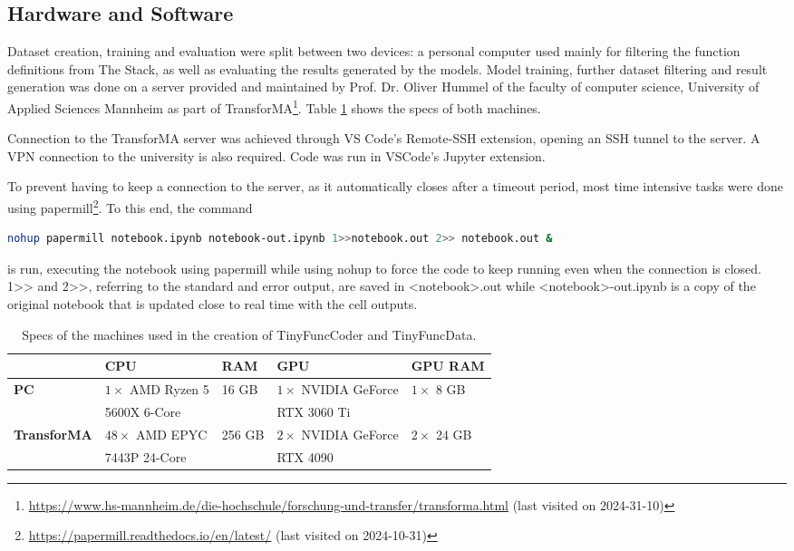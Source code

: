 \subsection{Hardware and Software}
\label{sec:hardware}
Dataset creation, training and evaluation were split between two devices: a personal computer used mainly for filtering the function definitions from The Stack, as well as evaluating the results generated by the models.
Model training, further dataset filtering and result generation was done on a server provided and maintained by Prof. Dr. Oliver Hummel of the faculty of computer science, University of Applied Sciences Mannheim as part of TransforMA\footnote{\url{https://www.hs-mannheim.de/die-hochschule/forschung-und-transfer/transforma.html} (last visited on 2024-31-10)}.
Table \ref{tab:architecture} shows the specs of both machines.

Connection to the TransforMA server was achieved through VS Code's Remote-SSH extension, opening an SSH tunnel to the server.
A VPN connection to the university is also required.
Code was run in VSCode's Jupyter extension.

To prevent having to keep a connection to the server, as it automatically closes after a timeout period, most time intensive tasks were done using papermill\footnote{\url{https://papermill.readthedocs.io/en/latest/} (last visited on 2024-10-31)}.
To this end, the command
\begin{lstlisting}[language=bash]
    nohup papermill notebook.ipynb notebook-out.ipynb 1>>notebook.out 2>> notebook.out &
\end{lstlisting}
is run, executing the notebook using papermill while using nohup to force the code to keep running even when the connection is closed.
1>{}> and 2>{}>, referring to the standard and error output, are saved in <notebook>.out while <notebook>-out.ipynb is a copy of the original notebook that is updated close to real time with the cell outputs.

\begin{table}[!h]
    \centering
    \caption{Specs of the machines used in the creation of TinyFuncCoder and TinyFuncData.}
    \begin{tabular}{l|l|l|l|l}
        \hline
        & \textbf{CPU} & \textbf{RAM} & \textbf{GPU} & \textbf{GPU RAM} \\
        \hline
        \textbf{PC} & $1\times$ AMD Ryzen 5 & 16 GB & $1\times$ NVIDIA GeForce & $1\times$ 8 GB \\
        & 5600X 6-Core & & RTX 3060 Ti & \\
        \hline
        \textbf{TransforMA} & $48\times$ AMD EPYC & 256 GB & $2\times$ NVIDIA GeForce & $2\times$ 24 GB \\
        & 7443P 24-Core & & RTX 4090 & \\
        \hline
    \end{tabular}
    \label{tab:architecture}
\end{table}

